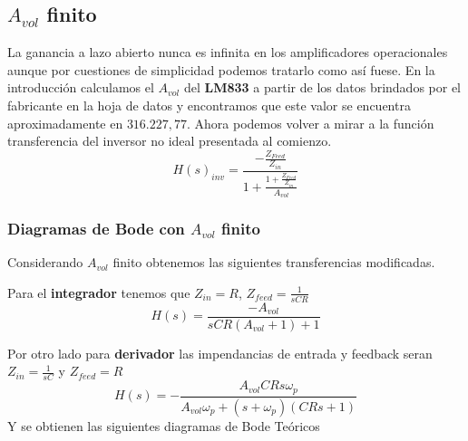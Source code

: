 \documentclass[a4paper]{article}
\begin{document}
\subsection{$A_{vol}$ finito}
La ganancia a lazo abierto nunca es infinita en los amplificadores operacionales aunque por cuestiones de simplicidad podemos tratarlo como así fuese. En la introducción calculamos el $A_{vol}$ del \textbf{LM833} a partir de los datos brindados por el fabricante en la hoja de datos y encontramos que este valor se encuentra aproximadamente en $316.227,77$.
Ahora podemos volver a mirar a la función transferencia del inversor no ideal presentada al comienzo.
$$H(s)_{inv} = \frac{-\frac{Z_{Feed}}{Z_{in}}}
{1+\frac{1+\frac{Z_{Feed}}{Z_{in}}}{A_{vol}}} $$


\subsubsection{Diagramas de Bode con $A_{vol}$ finito}
Considerando $A_{vol}$ finito obtenemos las siguientes transferencias modificadas.

Para el \textbf{integrador} tenemos que $Z_{in}=R$, $Z_{feed}=\frac{1}{sCR}$
$$H(s)=\frac{-A_{vol}}{sCR(A_{vol}+1)+1}$$

Por otro lado para \textbf{derivador} las impendancias de entrada y feedback seran $Z_{in} = \frac{1}{sC}$ y $Z_{feed}  = R$
$$H(s) = - \frac{A_{vol} C R s \omega_p}{A_{vol} \omega_p + \left(s + \omega_p\right) \left(C R s + 1\right)}$$
Y se obtienen las siguientes diagramas de Bode Teóricos 
\end{document}
